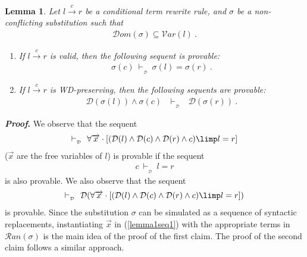 \documentclass[copyright]{eptcs}
\newtheorem{lemma}[theorem]{Lemma}
\begin{document}
\begin{lemma}\label{lemma1}
Let $l \xrightarrow{c} r$ be a conditional term rewrite rule, and $\sigma$ be a non-conflicting substitution such that
\begin{eqnarray*}
\mathcal{D}om(\sigma) \subseteq \mathcal{V}ar(l)~.
\end{eqnarray*}
\begin{enumerate}
\item If $l \xrightarrow{c} r$ is valid, then the following sequent is provable:
\begin{eqnarray*}
\sigma(c)~\vdash_{_\mathcal{D}}~\sigma(l)=\sigma(r)~.
\end{eqnarray*}
\item If $l \xrightarrow{c} r$ is WD-preserving, then the following sequents are provable:
\begin{eqnarray*}
\mathcal{D}(\sigma(l)) \land \sigma(c)&~\vdash_{_\mathcal{D}}~&\mathcal{D}(\sigma(r))~.
\end{eqnarray*}
\end{enumerate}
\end{lemma}
\noindent \textbf{\textit{Proof}. }
We observe that the sequent
\begin{eqnarray}
\vdash_{_\mathcal{D}}~\forall \overrightarrow{x}\cdot [(\mathcal{D}(l)\land \mathcal{D}(c) \land \mathcal{D}(r)\land c)\limp l=r]\label{lemma1seq1}
\end{eqnarray}
($\overrightarrow{x}$ are the free variables of $l$) is provable if the sequent
\begin{eqnarray*}
c~\vdash_{_\mathcal{D}}~l=r
\end{eqnarray*}
is also provable. We also observe that the sequent
\begin{eqnarray}
\vdash_{_\mathcal{D}}~\mathcal{D}(\forall \overrightarrow{x}\cdot [(\mathcal{D}(l)\land \mathcal{D}(c) \land \mathcal{D}(r)\land c)\limp l=r])
\end{eqnarray}
is provable. Since the substitution $\sigma$ can be simulated as a sequence of syntactic replacements, instantiating $\overrightarrow{x}$ in (\ref{lemma1seq1}) with the appropriate terms in $\mathcal{R}an(\sigma)$ is the main idea of the proof of the first claim. The proof of the second claim follows a similar approach.
\end{document}
